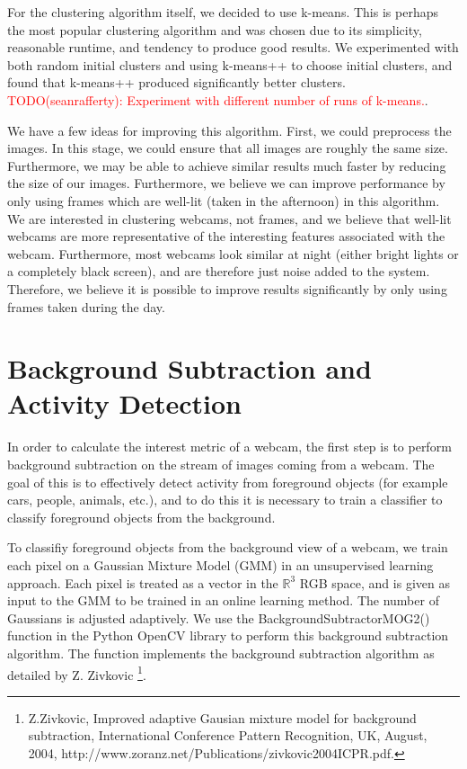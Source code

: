 \documentclass{article}
\begin{document}
For the clustering algorithm itself, we decided to use k-means. This is perhaps
the most popular clustering algorithm and was chosen due to its simplicity,
reasonable runtime, and tendency to produce good results. We experimented with
both random initial clusters and using k-means++ to choose initial clusters,
and found that k-means++ produced significantly better clusters.
\textcolor{red}{TODO(seanrafferty): Experiment with different number of runs of
k-means.}.

We have a few ideas for improving this algorithm. First, we could preprocess
the images. In this stage, we could ensure that all images are roughly the same
size. Furthermore, we may be able to achieve similar results much faster by
reducing the size of our images. Furthermore, we believe we can improve
performance by only using frames which are well-lit (taken in the afternoon) in
this algorithm. We are interested in clustering webcams, not frames, and we
believe that well-lit webcams are more representative of the interesting
features associated with the webcam. Furthermore, most webcams look similar at
night (either bright lights or a completely black screen), and are therefore
just noise added to the system. Therefore, we believe it is possible to improve
results significantly by only using frames taken during the day.



\section{Background Subtraction and Activity Detection}
In order to calculate the interest metric of a webcam, the first step is to
perform background subtraction on the stream of images coming from a webcam.
The goal of this is to effectively detect activity from foreground objects (for
example cars, people, animals, etc.), and to do this it is necessary to train a
classifier to classify foreground objects from the background.

To classifiy foreground objects from the background view of a webcam, we train
each pixel on a Gaussian Mixture Model (GMM) in an unsupervised learning
approach. Each pixel is treated as a vector in the $\mathbb{R}^3$ RGB space,
and is given as input to the GMM to be trained in an online learning method.
The number of Gaussians is adjusted adaptively. We use the
BackgroundSubtractorMOG2() function in the Python OpenCV library to perform
this background subtraction algorithm. The function implements the background
subtraction algorithm as detailed by Z. Zivkovic \footnote{Z.Zivkovic, Improved
adaptive Gausian mixture model for background subtraction, International
Conference Pattern Recognition, UK, August, 2004,
http://www.zoranz.net/Publications/zivkovic2004ICPR.pdf.}.
\end{document}
